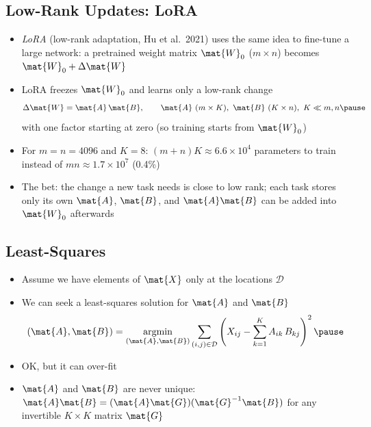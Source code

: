 \begin{slide}
\section[-2]{Low-Rank Updates: LoRA}

\begin{PauseHighLight}\squeeze
  \begin{itemize}
  \item \emph{LoRA} (low-rank adaptation, Hu et al.\ 2021) uses the same
    idea to fine-tune a large network: a pretrained weight matrix
    $\mat{W}_0$ ($m\times n$) becomes $\mat{W}_0 + \Delta\mat{W}$\pause
  \item LoRA freezes $\mat{W}_0$ and learns only a low-rank change
    \begin{align*}
      \Delta\mat{W} = \mat{A}\,\mat{B}, \qquad \mat{A}\ (m\times K),\
      \mat{B}\ (K\times n),\ K\ll m,n\pause
    \end{align*}
    with one factor starting at zero (so training starts from
    $\mat{W}_0$)\pause
  \item For $m=n=4096$ and $K=8$: $(m+n)K \approx 6.6\times10^4$
    parameters to train instead of $mn\approx1.7\times10^7$ (0.4\%)\pause
  \item The bet: the change a new task needs is close to low rank;\pause{}
    each task stores only its own $\mat{A}$, $\mat{B}$, and $\mat{A}\mat{B}$
    can be added into $\mat{W}_0$ afterwards\pause
  \end{itemize}
\end{PauseHighLight}

\end{slide}


\begin{slide}
\section{Least-Squares}

\begin{PauseHighLight}
  \begin{itemize}
  \item Assume we have elements of $\mat{X}$ only at the locations
    $\mathcal{D}$\pause
  \item We can seek a least-squares solution for $\mat{A}$ and $\mat{B}$
    \begin{align*}
      (\mat{A},\mat{B}) = \mathop{\mathrm{argmin}}\limits_{(\mat{A},\mat{B})}
      \sum_{(i,j)\in\mathcal{D}} \left( X_{ij} -
        \sum_{k=1}^K A_{ik} \, B_{kj} \right)^2\pause
    \end{align*}
  \item OK, but it can over-fit\pause
  \item $\mat{A}$ and $\mat{B}$ are never unique:
    $\mat{A}\mat{B} = (\mat{A}\mat{G})(\mat{G}^{-1}\mat{B})$ for any
    invertible $K\times K$ matrix $\mat{G}$\pause
  \end{itemize}
\end{PauseHighLight}

\end{slide}

